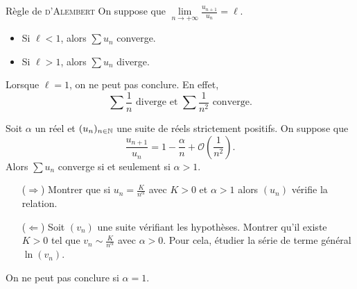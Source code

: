 \begin{theo}{Règle de \textsc{d'Alembert}}
    On suppose que $\lim\limits_{n \to + \infty} \frac{u_{n+1}}{u_n} = \ell$.
    \begin{itemize}
        \item Si $\ell < 1$, alors $\sum u_n$ converge.
        \item Si $\ell > 1$, alors $\sum u_n$ diverge.
    \end{itemize}
\end{theo}

Lorsque $\ell = 1$, on ne peut pas conclure. En effet, 
$$\sum \frac{1}{n} \text{ diverge et } \sum \frac{1}{n^2} \text{ converge}.$$

\begin{theo}{}
    Soit $\alpha$ un réel et $(u_n)_{n \in \mathbb{N}}$ une suite de réels strictement positifs. On suppose que
    $$\displaystyle \frac{u_{n+1}}{u_n} = 1 - \frac{\alpha}{n} + \mathcal{O} \left( \frac{1}{n^2} \right).$$ Alors $\sum u_n$ converge si et seulement si $\alpha > 1$. 
\end{theo}
\begin{preuve}
    \begin{enumerate}
        \item[($\Rightarrow$)] Montrer que si $u_n=\frac{K}{n^{\alpha}}$ avec $K>0$ et $\alpha > 1$ alors $(u_n)$ vérifie la relation.
        \item[($\Leftarrow$)] Soit $(v_n)$ une suite vérifiant les hypothèses. Montrer qu'il existe $K>0$ tel que $v_n \sim \frac{K}{n^{\alpha}}$ avec $\alpha > 0$. Pour cela, étudier la série de terme général $\ln (v_n)$.
    \end{enumerate}
\end{preuve}

On ne peut pas conclure si $\alpha=1$.